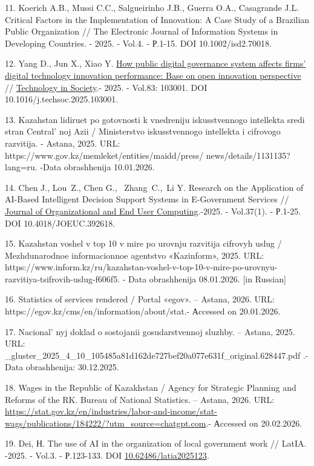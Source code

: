 \begin{refs}
11. Koerich A.B., Mussi C.C., Salgueirinho J.B., Guerra O.A., Casagrande
J.L. Critical Factors in the Implementation of Innovation: A Case Study
of a Brazilian Public Organization // The Electronic Journal of
Information Systems in Developing Countries. - 2025. - Vol.4. - Р.1-15.
DOI 10.1002/isd2.70018.

12. Yang D., Jun X., Xiao Y.
\href{https://ideas.repec.org/a/eee/teinso/v83y2025ics0160791x25001915.html}{How
public digital governance system affects firms'{} digital
technology innovation performance: Base on open innovation perspective}
// \href{https://ideas.repec.org/s/eee/teinso.html}{Technology in
Society}.- 2025. - Vol.83: 103001. DOI 10.1016/j.techsoc.2025.103001.

13. Kazahstan lidiruet po gotovnosti k vnedreniju iskusstvennogo
intellekta sredi stran Central' noj Azii / Ministerstvo
iskusstvennogo intellekta i cifrovogo razvitija. - Astana, 2025. URL:
https://www.gov.kz/memleket/entities/maidd/press/
news/details/1131135?lang=ru. -Data obrashhenija 10.01.2026.

14. Chen J., Lou~Z., Chen G.,~ Zhang~C.,~Li Y. Research on the
Application of AI-Based Intelligent Decision Support Systems in
E-Government Services //
\href{https://www.sciencedirect.com/org/journal/journal-of-organizational-and-end-user-computing}{Journal
of Organizational and End User Computing}.-2025. - Vol.37(1). - Р.1-25.
DOI 10.4018/JOEUC.392618.

15. Kazahstan voshel v top 10 v mire po urovnju razvitija cifrovyh uslug
/ Mezhdunarodnoe informacionnoe agentstvo «Kazinform», 2025. URL:
https://www.inform.kz/ru/kazahstan-voshel-v-top-10-v-mire-po-urovnyu-razvitiya-tsifrovih-uslug-f606f5.
- Data obrashhenija 08.01.2026. {[}in Russian{]}

16. Statistics of services rendered / Portal «egov». -- Astana, 2026.
URL: https://egov.kz/cms/en/information/about/stat.- Аccessed on
20.01.2026.

17. Nacional' nyj doklad o sostojanii gosudarstvennoj
sluzhby. -- Astana, 2025. URL:
\_gluster\_2025\_4\_10\_105485a81d162de727bef20a077e631f\_original.628447.pdf .-
Data obrashhenija: 30.12.2025.

18. Wages in the Republic of Kazakhstan / Agency for Strategic Planning
and Reforms of the RK. Bureau of National Statistics. -- Astana, 2026.
URL:
\url{https://stat.gov.kz/en/industries/labor-and-income/stat-wags/publications/184222/?utm_source=chatgpt.com}.-
Аccessed on 20.02.2026.

19. Dei, Н. The use of AI in the organization of local government work //
LatIA. -2025. - Vol.3. - Р.123-133. DOI
\href{https://doi.org/10.62486/latia2025123}{10.62486/latia2025123}.


\end{refs}
